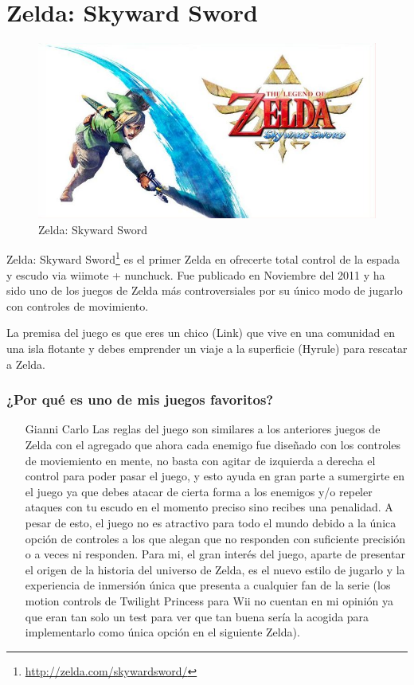 \section{Zelda: Skyward Sword}

\begin{figure}[htbp]
\begin{center}
\includegraphics[width=.60\textwidth]{./imagenes/skyward.jpg}
\caption{Zelda: Skyward Sword}
\label{Zelda: Skyward Sword}
\end{center}
\end{figure}
Zelda: Skyward Sword\footnote{\url{http://zelda.com/skywardsword/}} es el primer Zelda en ofrecerte total control de la espada y escudo via wiimote + nunchuck. Fue publicado en Noviembre del 2011 y ha sido uno de los juegos de Zelda más controversiales por su único modo de jugarlo con controles de movimiento.

La premisa del juego es que eres un chico (Link) que vive en una comunidad en una isla flotante y debes emprender un viaje a la superficie (Hyrule) para rescatar a Zelda.

\subsubsection{¿Por qué es uno de mis juegos favoritos?}
\begin{itemize}
\item[Gianni Carlo] Las reglas del juego son similares a los anteriores juegos de Zelda con el agregado que ahora cada enemigo fue diseñado con los controles de moviemiento en mente, no basta con agitar de izquierda a derecha el control para poder pasar el juego, y esto ayuda en gran parte a sumergirte en el juego ya que debes atacar de cierta forma a los enemigos y/o repeler ataques con tu escudo en el momento preciso sino recibes una penalidad. A pesar de esto, el juego no es atractivo para todo el mundo debido a la única opción de controles a los que alegan que no responden con suficiente precisión o a veces ni responden. Para mi, el gran interés del juego, aparte de presentar el origen de la historia del universo de Zelda, es el nuevo estilo de jugarlo y la experiencia de inmersión única que presenta a cualquier fan de la serie (los motion controls de Twilight Princess para Wii no cuentan en mi opinión ya que eran tan solo un test para ver que tan buena sería la acogida para implementarlo como única opción en el siguiente Zelda).
\end{itemize}